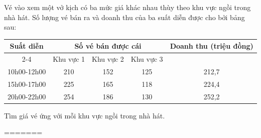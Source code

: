 \begin{bt}
	Vé vào xem một vở kịch có ba mức giá khác nhau thùy theo khu vực ngồi trong nhà hát. Số lượng vé bán ra và doanh thu của ba suất diễn được cho bởi bảng sau: 
	\begin{center}
		\begin{tabular}{|c|c|c|c|c|}
			\hline
			\multirow{2}{*}{Suất diễn }&\multicolumn{3}{c|}{Số vé bán được cái}&\multirow{2}{*}{Doanh thu (triệu đồng)}\\ \cline{2-4}
			& Khu vực 1 & Khu vực 2 & Khu vực 3&  \\ \hline
			10h00-12h00 & 210 & 152 & 125 &212,7 \\ \hline
			15h00-17h00 & 225 & 165 & 118 &224,4 \\ \hline
			20h00-22h00 &254 &186 & 130 &252,2 \\ \hline
		\end{tabular}
	\end{center}
	Tìm giá vé ứng với mỗi khu vực ngồi trong nhà hát.
\end{bt}

=======
